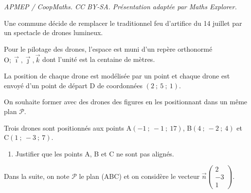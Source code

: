 \documentclass[10pt]{article}
\providecommand{\vect}[1]{\overrightarrow{#1}}
\providecommand{\Oijk}{\(\mathrm{O};\vec{\imath},\vec{\jmath},\vec{k}\)}
\begin{document}
\noindent\textit{APMEP / CoopMaths. CC BY-SA. Présentation adaptée par Maths Explorer.}\par\medskip
\medskip

Une commune décide de remplacer le traditionnel feu d'artifice du 14 juillet par un
spectacle de drones lumineux.

\smallskip

Pour le pilotage des drones, l'espace est muni d'un repère orthonormé \Oijk{} dont l'unité est la centaine de mètres.

\smallskip

La position de chaque drone est modélisée par un point et chaque drone est envoyé d'un point de départ D de coordonnées $(2~;~5~;~1)$.

\smallskip

On souhaite former avec des drones des figures en les positionnant dans un même plan $\mathcal{P}$.

\smallskip

Trois drones sont positionnés aux points A$(-1~;~-1~;~17)$, B$(4~;~-2~;~4)$ et C$(1~;~-3~;~7)$.

\begin{enumerate}
	\item Justifier que les points A, B et C ne sont pas alignés.
\end{enumerate}

Dans la suite, on note $\mathcal{P}$ le plan (ABC) et on considère le vecteur $\vect{n} \begin{pmatrix}2\\-3\\1\end{pmatrix}$.
\end{document}
